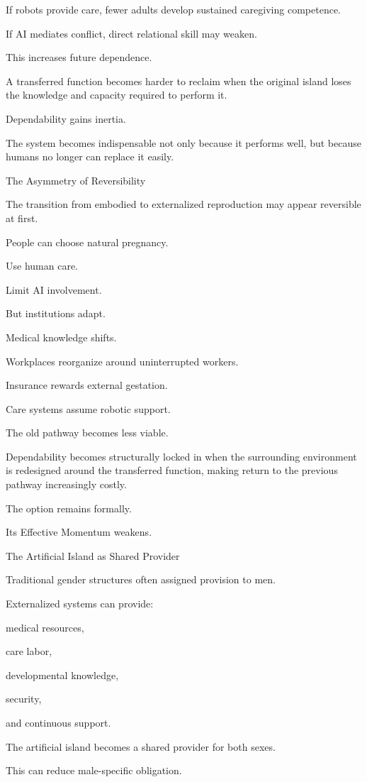 If robots provide care, fewer adults develop sustained caregiving competence.

If AI mediates conflict, direct relational skill may weaken.

This increases future dependence.

A transferred function becomes harder to reclaim when the original island loses the knowledge and capacity required to perform it.

Dependability gains inertia.

The system becomes indispensable not only because it performs well, but because humans no longer can replace it easily.

The Asymmetry of Reversibility

The transition from embodied to externalized reproduction may appear reversible at first.

People can choose natural pregnancy.

Use human care.

Limit AI involvement.

But institutions adapt.

Medical knowledge shifts.

Workplaces reorganize around uninterrupted workers.

Insurance rewards external gestation.

Care systems assume robotic support.

The old pathway becomes less viable.

Dependability becomes structurally locked in when the surrounding environment is redesigned around the transferred function, making return to the previous pathway increasingly costly.

The option remains formally.

Its Effective Momentum weakens.

The Artificial Island as Shared Provider

Traditional gender structures often assigned provision to men.

Externalized systems can provide:

medical resources,

care labor,

developmental knowledge,

security,

and continuous support.

The artificial island becomes a shared provider for both sexes.

This can reduce male-specific obligation.

